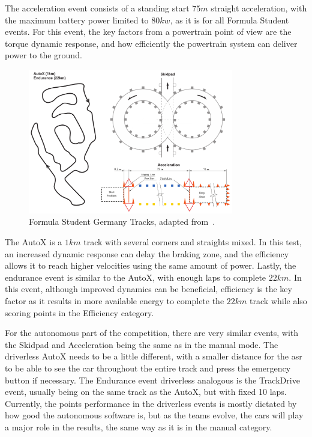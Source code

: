 The acceleration event consists of a standing start $75m$ straight acceleration, with the maximum battery power limited to $80kw$, as it is for all Formula Student events. For this event, the key factors from a powertrain point of view are the torque dynamic response, and how efficiently the powertrain system can deliver power to the ground. 
\begin{figure}[!htb]
	\centering
	\includegraphics[width=0.8\textwidth]{Figures/Tracks.pdf}
	\caption[Formula Student Germany Tracks.]{Formula Student Germany Tracks, adapted from~\cite{FSG:rules:2023}.}
	\label{fig:fs_tracks} %
\end{figure}
The AutoX is a $1km$ track with several corners and straights mixed. In this test, an increased dynamic response can delay the braking zone, and the efficiency allows it to reach higher velocities using the same amount of power. Lastly, the endurance event is similar to the AutoX, with enough laps to complete $22km$. In this event, although improved dynamics can be beneficial, efficiency is the key factor as it results in more available energy to complete the $22km$ track while also scoring points in the Efficiency category. 

For the autonomous part of the competition, there are very similar events, with the Skidpad and Acceleration being the same as in the manual mode. The driverless AutoX needs to be a little different, with a smaller distance for the \gls{asr} to be able to see the car throughout the entire track and press the emergency button if necessary. The Endurance event driverless analogous is the TrackDrive event, usually being on the same track as the AutoX, but with fixed 10 laps. Currently, the points performance in the driverless events is mostly dictated by how good the autonomous software is, but as the teams evolve, the cars will play a major role in the results, the same way as it is in the manual category.


